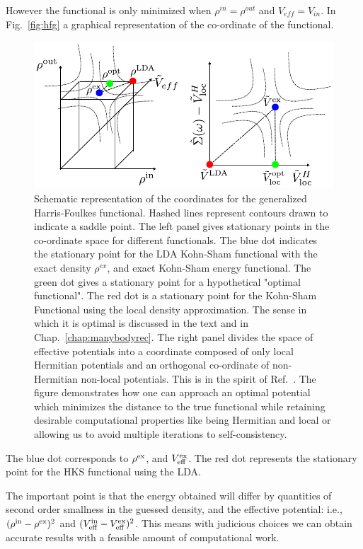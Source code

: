 However the functional is only minimized when $\rho^{in} = \rho^{out}$ and $V_{eff}=V_{in}$.
In Fig.~\ref{fig:hfg} a graphical representation of the co-ordinate of the functional.
%
\begin{figure}
\begin{center}
\includegraphics{./GW/HFG_space.pdf}
\caption{Schematic representation of the coordinates for the generalized
Harris-Foulkes functional. Hashed lines represent contours drawn to indicate
a saddle point. The left panel gives stationary points in the co-ordinate space
for different functionals. The blue dot indicates the stationary point for the
LDA Kohn-Sham functional with the exact density $\rho^{ex}$, 
and exact Kohn-Sham energy functional. The green dot gives a stationary point
for a hypothetical "optimal functional". The red dot is a stationary point
for the Kohn-Sham Functional using the local density approximation. The sense in which it is optimal 
is discussed in the text and in Chap.~\ref{chap:manybodyrec}. The
right panel divides the space of effective potentials into a coordinate 
composed of only local Hermitian potentials and an orthogonal co-ordinate 
of non-Hermitian non-local potentials. This is in the spirit of Ref.~\cite{sohrab10}. 
The figure demonstrates how one can approach an optimal
potential which minimizes the distance to the true functional 
while retaining desirable computational properties like being Hermitian and local
or allowing us to avoid multiple iterations to self-consistency.}
\end{center}
\end{figure}
%
The blue dot corresponds to $\rho^{\rm ex}$, and $V^{\rm ex}_{\rm eff}$. The red dot
represents the stationary point for the HKS functional using the LDA.

The important point is that the energy obtained will differ by quantities of second
order smallness in the guessed density, and the effective potential: i.e., 
$(\rho^{\rm in}-\rho^{\rm ex})^{2}$ and $(V_{\rm eff}^{\rm in}-V_{\rm eff}^{\rm ex})^{2}$.
This means with judicious choices we can obtain accurate results with a feasible
amount of computational work.

